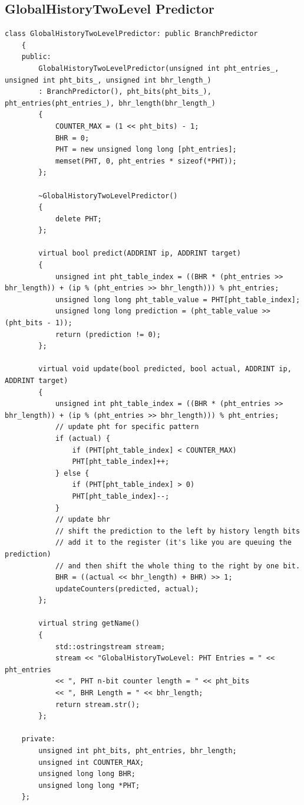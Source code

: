 \documentclass{article}
\newcommand{\eng}[1]{\foreignlanguage{english}{#1}}
\begin{document}
\subsection{\eng{GlobalHistoryTwoLevel Predictor}}
\begin{lstlisting}[style=Cstyle]
    class GlobalHistoryTwoLevelPredictor: public BranchPredictor
    {
    public:
        GlobalHistoryTwoLevelPredictor(unsigned int pht_entries_, unsigned int pht_bits_, unsigned int bhr_length_)
        : BranchPredictor(), pht_bits(pht_bits_), pht_entries(pht_entries_), bhr_length(bhr_length_)
        {
            COUNTER_MAX = (1 << pht_bits) - 1;
            BHR = 0;
            PHT = new unsigned long long [pht_entries];
            memset(PHT, 0, pht_entries * sizeof(*PHT));
        };

        ~GlobalHistoryTwoLevelPredictor()
        {
            delete PHT;
        };

        virtual bool predict(ADDRINT ip, ADDRINT target)
        {
            unsigned int pht_table_index = ((BHR * (pht_entries >> bhr_length)) + (ip % (pht_entries >> bhr_length))) % pht_entries;
            unsigned long long pht_table_value = PHT[pht_table_index];
            unsigned long long prediction = (pht_table_value >> (pht_bits - 1));
            return (prediction != 0);
        };

        virtual void update(bool predicted, bool actual, ADDRINT ip, ADDRINT target)
        {
            unsigned int pht_table_index = ((BHR * (pht_entries >> bhr_length)) + (ip % (pht_entries >> bhr_length))) % pht_entries;
            // update pht for specific pattern
            if (actual) {
                if (PHT[pht_table_index] < COUNTER_MAX)
                PHT[pht_table_index]++;
            } else {
                if (PHT[pht_table_index] > 0)
                PHT[pht_table_index]--;
            }
            // update bhr
            // shift the prediction to the left by history length bits
            // add it to the register (it's like you are queuing the prediction)
            // and then shift the whole thing to the right by one bit.
            BHR = ((actual << bhr_length) + BHR) >> 1;
            updateCounters(predicted, actual);
        };

        virtual string getName()
        {
            std::ostringstream stream;
            stream << "GlobalHistoryTwoLevel: PHT Entries = " << pht_entries
            << ", PHT n-bit counter length = " << pht_bits
            << ", BHR Length = " << bhr_length;
            return stream.str();
        };

    private:
        unsigned int pht_bits, pht_entries, bhr_length;
        unsigned int COUNTER_MAX;
        unsigned long long BHR;
        unsigned long long *PHT;
    };
\end{lstlisting}
\clearpage
\end{document}
